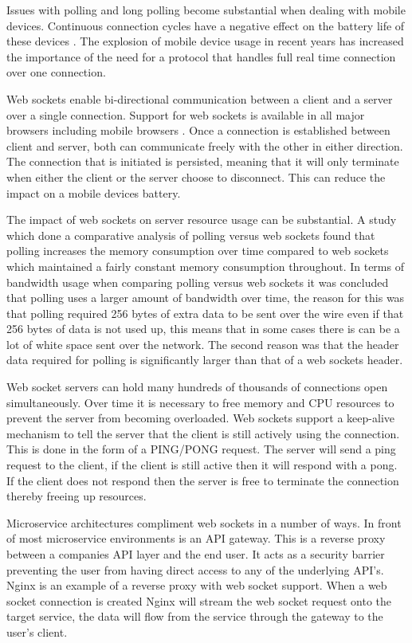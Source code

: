 Issues with polling and long polling become substantial when dealing with mobile devices. Continuous connection cycles have a negative effect on the battery life of these devices \cite{6364271}. The explosion of mobile device usage in recent years \cite{6365155} has increased the importance of the need for a protocol that handles full real time connection over one connection.

Web sockets enable bi-directional communication between a client and a server over a single connection. Support for web sockets is available in all major browsers including mobile browsers \cite{websocket-browser-support}. Once a connection is established between client and server, both can communicate freely with the other in either direction. The connection that is initiated is persisted, meaning that it will only terminate when either the client or the server choose to disconnect. This can reduce the impact on a mobile devices battery.

The impact of web sockets on server resource usage can be substantial. A study which done a comparative analysis of polling versus web sockets found that polling increases the memory consumption over time compared to web sockets which maintained a fairly constant memory consumption throughout\cite{6601579}. In terms of bandwidth usage when comparing polling versus web sockets it was concluded that polling uses a larger amount of bandwidth over time, the reason for this was that polling required 256 bytes of extra data to be sent over the wire even if that 256 bytes of data is not used up, this means that in some cases there is can be a lot of white space sent over the network. The second reason was that the header data required for polling is significantly larger than that of a web sockets header\cite{6601579}.

Web socket servers can hold many hundreds of thousands of connections open simultaneously. Over time it is necessary to free memory and CPU resources to prevent the server from becoming overloaded. Web sockets support a keep-alive mechanism to tell the server that the client is still actively using the connection. This is done in the form of a PING/PONG request. The server will send a ping request to the client, if the client is still active then it will respond with a pong. If the client does not respond then the server is free to terminate the connection thereby freeing up resources. 

Microservice architectures compliment web sockets in a number of ways. In front of most microservice environments is an API gateway\cite{6885428}. This is a reverse proxy between a companies API layer and the end user. It acts as a security barrier preventing the user from having direct access to any of the underlying API's. Nginx is an example of a reverse proxy with web socket support. When a web socket connection is created Nginx will stream the web socket request onto the target service, the data will flow from the service through the gateway to the user's client. 

